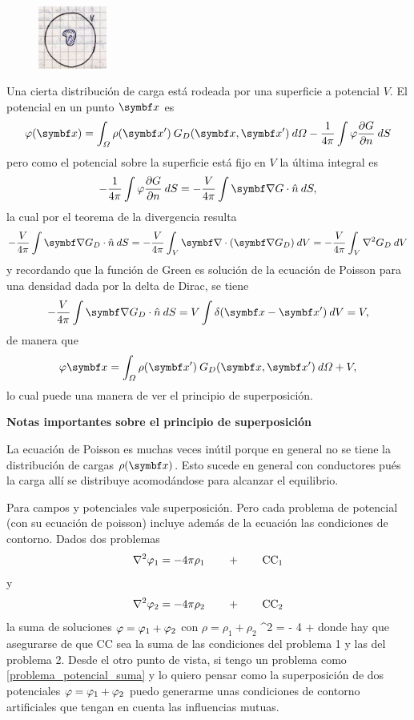 \documentclass[10pt,oneside]{CBFT_book}
\begin{document}
\begin{figure}[htb]
	\begin{center}
	\includegraphics[width=0.2\textwidth]{images/fig_ft1_rho_rodeada_por_V.jpg}	 
	\end{center}
	\caption{}
\end{figure} 

Una cierta distribución de carga está rodeada por una superficie a potencial $V$.
El potencial en un punto $\vbx$ es
\[
	\vp(\vbx) = \int_\Omega \rho(\vbx') \: G_D(\vbx,\vbx') \: d\Omega 
	- \frac{1}{4\pi} \int \vp \dpar{G}{n} \: dS
\]
pero como el potencial sobre la superficie está fijo en $V$ la última integral es 
\[
	- \frac{1}{4\pi} \int \vp \dpar{G}{n} \: dS = - \frac{V}{4\pi} \int \Nabla G \cdot\hat{n} \: dS,
\]
la cual por el teorema de la divergencia resulta
\[
	- \frac{V}{4\pi} \int \Nabla G_D \cdot\hat{n} \: dS =
	- \frac{V}{4\pi} \int_V \Nabla \cdot (\Nabla G_D) \: dV =
	- \frac{V}{4\pi} \int_V \lapm{G_D} \: dV
\]
y recordando que la función de Green es solución de la ecuación de Poisson para una densidad dada por
la delta de Dirac, se tiene
\[
	- \frac{V}{4\pi} \int \Nabla G_D \cdot\hat{n} \: dS = 
	V \int \delta(\vbx - \vbx') \: dV = V,
\]
de manera que 
\[
	\vp{\vbx} = \int_\Omega \rho(\vbx') \: G_D(\vbx,\vbx') \: d\Omega  + V,
\]
lo cual puede una manera de ver el principio de superposición.


\textbf{Notas importantes sobre el principio de superposición}

La ecuación de Poisson es muchas veces inútil porque en general no se tiene la distribución de cargas
$ \rho(\vbx) $. Esto sucede en general con conductores pués la carga allí se distribuye acomodándose
para alcanzar el equilibrio.

Para campos y potenciales vale superposición.
Pero cada problema de potencial (con su ecuación de poisson) incluye además de la ecuación las condiciones
de contorno. 
Dados dos problemas
\[
	\nabla^2 \varphi_1 = - 4 \pi \rho_1 \qquad + \qquad \text{CC}_1
\]
y
\[
	\nabla^2 \varphi_2 = - 4 \pi \rho_2 \qquad + \qquad \text{CC}_2
\]
la suma de soluciones $ \varphi = \varphi_1 + \varphi_2 $ con $\rho = \rho_1 + \rho_2 $
\be
	\nabla^2 \rho = - 4 \pi \rho \qquad + \qquad {}
	\label{problema_potencial_suma}
\ee
donde hay que asegurarse de que $ \text{CC} $ sea la suma de las condiciones del problema 1 y las del
problema 2.
Desde el otro punto de vista, si tengo un problema como \eqref{problema_potencial_suma} y lo quiero
pensar como la superposición de dos potenciales $ \varphi = \varphi_1 + \varphi_2 $ puedo generarme unas condiciones
de contorno artificiales que tengan en cuenta las influencias mutuas.
\end{document}
